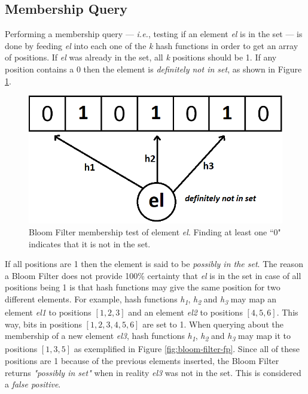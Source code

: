 \subsection*{Membership Query}
Performing a membership query --- \textit{i.e.}, testing if an element \textit{el} is in the set --- is done by feeding \textit{el} into each one of the \textit{k} hash functions in order to get an array of positions. If \textit{el} was already in the set, all \textit{k} positions should be 1. If any position contains a 0 then the element is \textit{definitely not in set}, as shown in Figure \ref{fig:bloom-filter}. 

\begin{figure}[!htb]
    \begin{center}
      \includegraphics[scale=0.3]{figures/query-bloom.png}
      \caption[Bloom Filter membership query]{Bloom Filter membership test of element \textit{el}. Finding at least one ``0" indicates that it is not in the set.}
      \label{fig:bloom-filter}
    \end{center}
\end{figure}

If all positions are 1 then the element is said to be \textit{possibly in the set}. The reason a Bloom Filter does not provide 100\% certainty that \textit{el} is in the set in case of all positions being 1 is that hash functions may give the same position for two different elements. For example, hash functions \textit{h\textsubscript{1}}, \textit{h\textsubscript{2}} and \textit{h\textsubscript{3}} may map an element \textit{el1} to positions $[1,2,3]$ and an element \textit{el2} to positions $[4,5,6]$. This way, bits in positions $[1,2,3,4,5,6]$ are set to 1. When querying about the membership of a new element \textit{el3}, hash functions \textit{h\textsubscript{1}}, \textit{h\textsubscript{2}} and \textit{h\textsubscript{3}} may map it to positions $[1,3,5]$ as exemplified in Figure \ref{fig:bloom-filter-fp}. Since all of these positions are 1 because of the previous elements inserted, the Bloom Filter returns \textit{"possibly in set"} when in reality \textit{el3} was not in the set. This is considered a \textit{false positive}.

